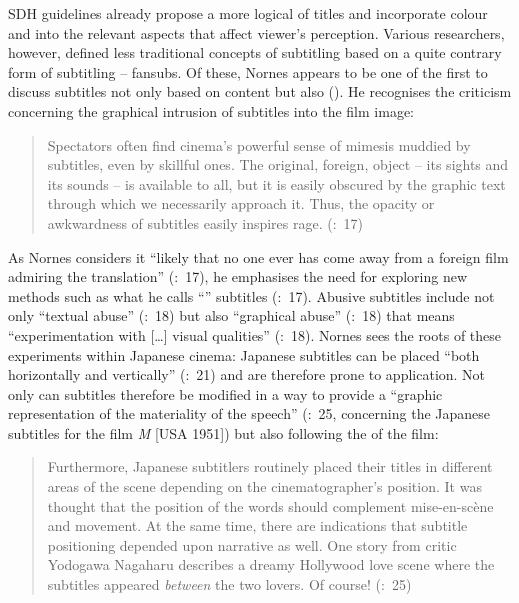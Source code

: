 SDH guidelines already propose a more logical  of titles and incorporate colour and  into the relevant aspects that affect viewer’s perception. Various researchers, however, defined less traditional concepts of subtitling based on a quite contrary form of subtitling – fansubs. Of these, Nornes appears to be one of the first to discuss subtitles not only based on content but also  (\citeyear{nornes1999}). He recognises the criticism concerning the graphical intrusion of subtitles into the film image:
\begin{quote}
Spectators often find cinema’s powerful sense of mimesis muddied by subtitles, even by skillful ones. The original, foreign, object – its sights and its sounds – is available to all, but it is easily obscured by the graphic text through which we necessarily approach it. Thus, the opacity or awkwardness of subtitles easily inspires rage. (\citeyear{nornes1999}:~17)
\end{quote}
As Nornes considers it “likely that no one ever has come away from a foreign film admiring the translation” (\citeyear{nornes1999}:~17), he emphasises the need for exploring new methods such as what he calls “” subtitles (\citeyear{nornes1999}:~17). Abusive subtitles include not only “textual abuse” (\citealt{nornes1999}:~18) but also “graphical abuse” (\citeyear{nornes1999}:~18) that means “experimentation with […] visual qualities” (\citeyear{nornes1999}:~18). Nornes sees the roots of these experiments within Japanese cinema: Japanese subtitles can be placed “both horizontally and vertically” (\citeyear{nornes1999}:~21) and are therefore prone to  application. Not only can subtitles therefore be modified in a way to provide a “graphic representation of the materiality of the speech” (\citealt{nornes1999}:~25, concerning the Japanese subtitles for the film \textit{M} [USA 1951]) but also following the  of the film:
\begin{quote}
Furthermore, Japanese subtitlers routinely placed their titles in different areas of the scene depending on the cinematographer’s position. It was thought that the position of the words should complement mise-en-scène and movement. At the same time, there are indications that subtitle positioning depended upon narrative as well. One story from critic Yodogawa Nagaharu describes a dreamy Hollywood love scene where the subtitles appeared \textit{between} the two lovers. Of course! (\citealt{nornes1999}:~25)
\end{quote}
